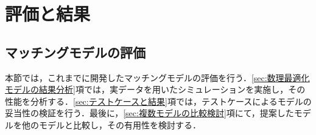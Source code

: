 \section{評価と結果}
  \label{sec:評価と結果}
    \par
  
  \subsection{マッチングモデルの評価}
    \label{sec:マッチングモデルの評価}
      \par 本節では，これまでに開発したマッチングモデルの評価を行う．\ref{sec:数理最適化モデルの結果分析}項では，実データを用いたシミュレーションを実施し，その性能を分析する．\ref{sec:テストケースと結果}項では，テストケースによるモデルの妥当性の検証を行う．最後に，\ref{sec:複数モデルの比較検討}項にて，提案したモデルを他のモデルと比較し，その有用性を検討する．
  

